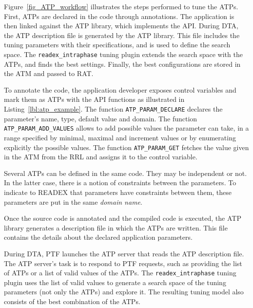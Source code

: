 Figure~\ref{fig_ATP_workflow} illustrates the steps performed to tune the ATPs. First, ATPs are declared in the code through annotations. The application is then linked against the ATP library, which implements the API. During DTA, the ATP description file is generated by the ATP library. This file includes the tuning parameters with their specifications, and is used to define the search space. The \texttt{readex\_intraphase} tuning plugin extends the search space with the ATPs, and finds the best settings. Finally, the best configurations are stored in the ATM and passed to RAT.

To annotate the code, the application developer exposes control variables and mark them as ATPs with the API functions as illustrated in Listing~\ref{lbl:atp_example}. The function \texttt{ATP\_PARAM\_DECLARE} declares the parameter's name, type, default value and domain. The function \texttt{ATP\_PARAM\_ADD\_VALUES} allows to add possible values the parameter can take, in a range specified by minimal, maximal and increment values or by enumerating explicitly the possible values. The function \texttt{ATP\_PARAM\_GET} fetches the value given in the ATM from the RRL and assigns it to the control variable. 

Several ATPs can be defined in the same code. They may be independent or not. In the latter case, there is a notion of constraints between the parameters. To indicate to READEX that parameters have constraints between them, these parameters are put in the same \textit{domain name}.

Once the source code is annotated and the compiled code is executed, the ATP library generates a description file in which the ATPs are written. This file contains the details about the declared application parameters.

During DTA, PTF launches the ATP server that reads the ATP description file. The ATP server's task is to respond to PTF requests, such as providing the list of ATPs or a list of valid values of the ATPs. The \texttt{readex\_intraphase} tuning plugin uses the list of valid values to generate a search space of the tuning parameters (not only the ATPs) and explore it. The resulting tuning model also consists of the best combination of the ATPs.
\newpage


